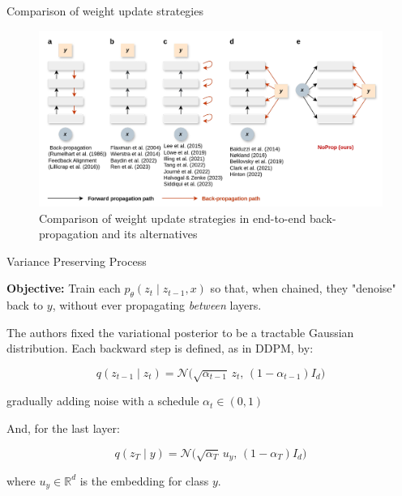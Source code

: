 \documentclass{beamer}
\begin{document}
\begin{frame}{Comparison of weight update strategies}


\begin{figure}
    \centering
    \includegraphics[width=1\linewidth]{comparison.png}
    \caption{ Comparison of weight update strategies in end-to-end back-propagation and its alternatives}
    \label{fig:placeholder}
\end{figure}

\end{frame}


\begin{frame}{Variance Preserving Process}

\textbf{Objective:} Train each \(p_\theta(z_t\mid z_{t-1},x)\) so that, when chained, they "denoise" back to \(y\), without ever propagating \emph{between} layers.

\medskip


The authors fixed the variational posterior to be a tractable Gaussian distribution. Each backward step is defined, as in DDPM, by: 

\[
q(z_{t-1} \mid z_t) = \mathcal{N}\big(\sqrt{\alpha_{t-1}} \, z_t, \, (1-\alpha_{t-1}) I_d\big)
\]

gradually adding noise with a schedule $\alpha_t\in(0, 1)$

\medskip

And, for the last layer:

\[
q(z_{T} \mid y) = \mathcal{N}\big(\sqrt{\alpha_{T}} \, u_y, \, (1-\alpha_{T}) I_d\big)
\]

where $u_y \in \mathbb{R}^d$ is the embedding for class $y$.

\end{frame}
\end{document}
